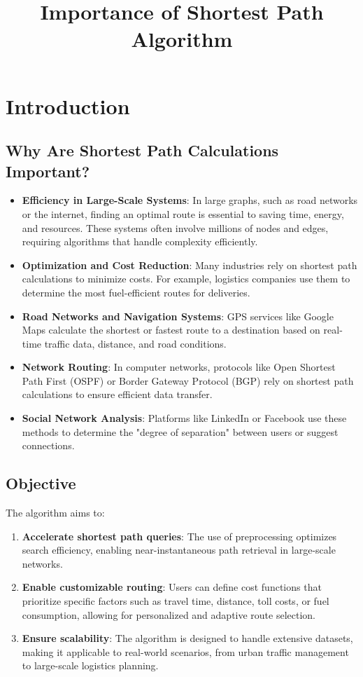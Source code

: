 \chapter{Introduction}

\title{Importance of Shortest Path Algorithm}

	\section{Why Are Shortest Path Calculations Important?}
	\begin{itemize}
		\item \textbf{Efficiency in Large-Scale Systems}: In large graphs, such as road networks or the internet, finding an optimal route is essential to saving time, energy, and resources. These systems often involve millions of nodes and edges, requiring algorithms that handle complexity efficiently.
		\item \textbf{Optimization and Cost Reduction}: Many industries rely on shortest path calculations to minimize costs. For example, logistics companies use them to determine the most fuel-efficient routes for deliveries.
		\item \textbf{Road Networks and Navigation Systems}: GPS services like Google Maps calculate the shortest or fastest route to a destination based on real-time traffic data, distance, and road conditions.
		\item \textbf{Network Routing}: In computer networks, protocols like Open Shortest Path First (OSPF) or Border Gateway Protocol (BGP) rely on shortest path calculations to ensure efficient data transfer.
		\item \textbf{Social Network Analysis}: Platforms like LinkedIn or Facebook use these methods to determine the "degree of separation" between users or suggest connections.
	\end{itemize}
	
	\section{Objective}
	The algorithm aims to:
	\begin{enumerate}
		\item \textbf{Accelerate shortest path queries}: The use of preprocessing optimizes search efficiency, enabling near-instantaneous path retrieval in large-scale networks.
		\item \textbf{Enable customizable routing}: Users can define cost functions that prioritize specific factors such as travel time, distance, toll costs, or fuel consumption, allowing for personalized and adaptive route selection.
		\item \textbf{Ensure scalability}: The algorithm is designed to handle extensive datasets, making it applicable to real-world scenarios, from urban traffic management to large-scale logistics planning.
	\end{enumerate}
	
